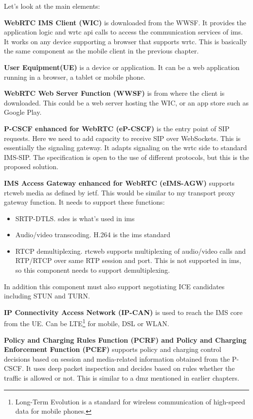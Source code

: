 Let's look at the main elements:

\textbf{WebRTC IMS Client (WIC)}
is downloaded from the WWSF. It provides the application logic and \gls{wrtc} \gls{api} calls to access the communication services of \gls{ims}. It works on any device supporting a browser that supports \gls{wrtc}. This is basically the same component as the mobile client in the previous chapter.

\textbf{User Equipment(UE)}
is a device or application. It can be a web application running in a browser, a tablet or mobile phone.

\textbf{WebRTC Web Server Function (WWSF)}
is from where the client is downloaded. This could be a web server hosting the WIC, or an app store such as Google Play.

\textbf{P-CSCF enhanced for WebRTC (eP-CSCF)}
is the entry point of SIP requests. Here we need to add capacity to receive SIP over WebSockets. This is essentially the signaling gateway. It adapts signaling on the \gls{wrtc} side to standard IMS-SIP. The specification is open to the use of different protocols, but this is the proposed solution.

\textbf{IMS Access Gateway enhanced for WebRTC (eIMS-AGW)}
supports \gls{rtcweb} media as defined by \gls{ietf}. This would be similar to my transport proxy gateway function. It needs to support these functions:
\begin{itemize}
\item{SRTP-DTLS. \gls{sdes} is what's used in \gls{ims}}
\item{Audio/video transcoding. H.264 is the \gls{ims} standard}
\item{RTCP demultiplexing. \gls{rtcweb} supports multiplexing of audio/video calls and RTP/RTCP over same RTP session and port. This is not supported in \gls{ims}, so this component needs to support demultiplexing.}
\end{itemize}

In addition this component must also support negotiating ICE candidates including STUN and TURN.

\textbf{IP Connectivity Access Network (IP-CAN)}
is used to reach the IMS core from the UE. Can be LTE\footnote{Long-Term Evolution is a standard for wireless communication of high-speed data for mobile phones.} for mobile, DSL or WLAN.

\textbf{Policy and Charging Rules Function (PCRF) and Policy and Charging Enforcement Function (PCEF)}
supports policy and charging control decisions based on session and media-related information obtained from the P-CSCF. It uses deep packet inspection and decides based on rules whether the traffic is allowed or not. This is similar to a \gls{dmz} mentioned in earlier chapters.

